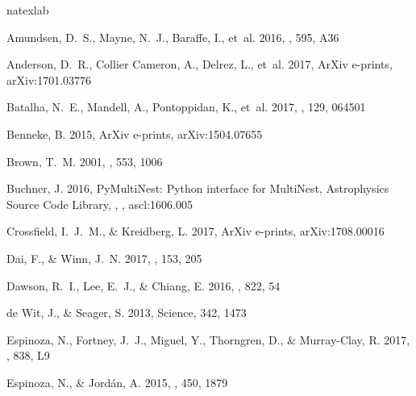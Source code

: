 \documentclass[twocolumn, trackchanges]{aastex61}
\begin{document}
\begin{thebibliography}{}
\expandafter\ifx\csname natexlab\endcsname\relax\def\natexlab#1{#1}\fi
\providecommand{\url}[1]{\href{#1}{#1}}

{Amundsen}, D.~S., {Mayne}, N.~J., {Baraffe}, I., {et~al.} 2016, \aap, 595, A36

{Anderson}, D.~R., {Collier Cameron}, A., {Delrez}, L., {et~al.} 2017, ArXiv
  e-prints, arXiv:1701.03776

{Batalha}, N.~E., {Mandell}, A., {Pontoppidan}, K., {et~al.} 2017, \pasp, 129,
  064501

{Benneke}, B. 2015, ArXiv e-prints, arXiv:1504.07655

{Brown}, T.~M. 2001, \apj, 553, 1006

{Buchner}, J. 2016, {PyMultiNest: Python interface for MultiNest}, Astrophysics
  Source Code Library, , , ascl:1606.005

{Crossfield}, I.~J.~M., \& {Kreidberg}, L. 2017, ArXiv e-prints,
  arXiv:1708.00016

{Dai}, F., \& {Winn}, J.~N. 2017, \aj, 153, 205

{Dawson}, R.~I., {Lee}, E.~J., \& {Chiang}, E. 2016, \apj, 822, 54

{de Wit}, J., \& {Seager}, S. 2013, Science, 342, 1473

{Espinoza}, N., {Fortney}, J.~J., {Miguel}, Y., {Thorngren}, D., \&
  {Murray-Clay}, R. 2017, \apjl, 838, L9

{Espinoza}, N., \& {Jord{\'a}n}, A. 2015, \mnras, 450, 1879


\end{thebibliography}
\end{document}
